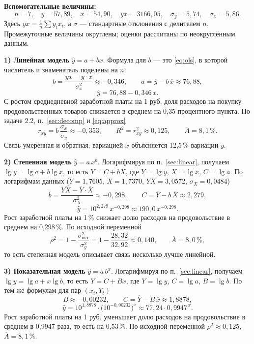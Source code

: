 \begin{solution}
\textbf{Вспомогательные величины:}
\[
  n = 7, \quad
  \overline{y} = 57{,}89, \quad
  \overline{x} = 54{,}90, \quad
  \overline{yx} = 3166{,}05, \quad
  \sigma_y = 5{,}74, \quad
  \sigma_x = 5{,}86 .
\]
Здесь $\overline{yx} = \frac{1}{n}\sum y_tx_t$, а $\sigma$ — стандартные
отклонения с делителем $n$. Промежуточные величины округлены; оценки рассчитаны
по неокруглённым данным.

\medskip
\textbf{1) Линейная модель} $\widehat{y} = a + bx$. Формула для $b$ — это
\eqref{eq:ols}, в которой числитель и знаменатель поделены на $n$:
\[
  b = \frac{\overline{yx} - \overline{y}\cdot\overline{x}}{\sigma_x^2} \approx -0{,}346,
  \qquad
  a = \overline{y} - b\,\overline{x} \approx 76{,}88,
\]
\[
  \widehat{y} = 76{,}88 - 0{,}346\,x .
\]
С ростом среднедневной заработной платы на 1 руб. доля расходов на покупку
продовольственных товаров снижается в среднем на 0,35 процентного пункта.
По задаче 2.2, п.~\ref{sec:decomp} и \eqref{eq:approx}
\[
  r_{xy} = b\,\frac{\sigma_x}{\sigma_y} \approx -0{,}353,
  \qquad
  R^2 = r_{xy}^2 \approx 0{,}125,
  \qquad
  \overline{A} = 8{,}1\,\% .
\]
Связь умеренная и обратная; вариацией $x$ объясняется 12,5\,\% вариации $y$.

\medskip
\textbf{2) Степенная модель} $\widehat{y} = a\,x^{b}$. Логарифмируя по
п.~\ref{sec:linear}, получаем $\lg y = \lg a + b\lg x$, то есть $Y = C + bX$,
где $Y = \lg y$, $X = \lg x$, $C = \lg a$. По логарифмам данных
($\overline{Y} = 1{,}7605$, $\overline{X} = 1{,}7370$,
$\overline{YX} = 3{,}0572$, $\sigma_X = 0{,}0484$)
\[
  b = \frac{\overline{YX} - \overline{Y}\cdot\overline{X}}{\sigma_X^2} \approx -0{,}298,
  \qquad
  C = \overline{Y} - b\,\overline{X} \approx 2{,}279,
\]
\[
  \widehat{y} = 10^{2{,}279}\,x^{-0{,}298} \approx 190{,}0\,x^{-0{,}298}.
\]
Рост заработной платы на 1\,\% снижает долю расходов на продовольствие в
среднем на 0,298\,\%. По исходной переменной
\[
  \rho^2 = 1 - \frac{\sigma^2_{\text{ост}}}{\sigma_y^2}
         = 1 - \frac{28{,}32}{32{,}92} \approx 0{,}140,
  \qquad
  \overline{A} = 8{,}0\,\% ,
\]
то есть степенная модель описывает связь несколько лучше линейной.

\medskip
\textbf{3) Показательная модель} $\widehat{y} = a\,b^{x}$. Логарифмируя по
п.~\ref{sec:linear}, получаем $\lg y = \lg a + x\lg b$, то есть $Y = C + Bx$,
где $Y = \lg y$, $C = \lg a$, $B = \lg b$. По тем же формулам для пар
$(x_t, Y_t)$
\[
  B \approx -0{,}00232,
  \qquad
  C = \overline{Y} - B\,\overline{x} \approx 1{,}8878,
\]
\[
  \widehat{y} = 10^{1{,}8878}\cdot\bigl(10^{-0{,}00232}\bigr)^{x}
              \approx 77{,}24\cdot 0{,}9947^{\,x}.
\]
Рост заработной платы на 1 руб. уменьшает долю расходов на продовольствие в
среднем в 0,9947 раза, то есть на 0,53\,\%. По исходной переменной
$\rho^2 \approx 0{,}125$, $\overline{A} = 8{,}1\,\%$.


\end{solution}
